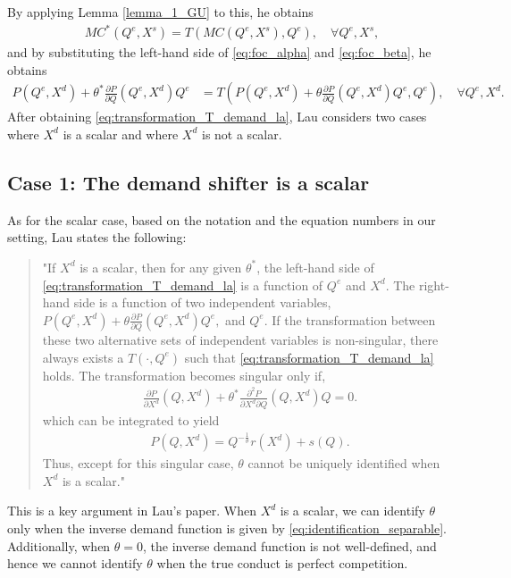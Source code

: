 \documentclass[11pt, a4paper]{article}
\theoremstyle{remark}
\begin{document}
By applying Lemma \ref{lemma_1_GU} to this, he obtains
\begin{align}
    MC^{*}(Q^e, X^{s}) = T\left(MC(Q^e, X^{s}), Q^e\right), \quad \forall Q^e, X^{s}, \label{eq:transformation_T_mc_la}
\end{align}
and by substituting the left-hand side of \eqref{eq:foc_alpha} and \eqref{eq:foc_beta}, he obtains 
\begin{align}
    P(Q^e, X^{d}) + \theta^{*} \frac{\partial P}{\partial Q}(Q^e, X^{d}) Q^e & = T\left(P(Q^e, X^{d}) + \theta \frac{\partial P}{\partial Q}(Q^e, X^{d}) Q^e, Q^e\right), \quad \forall Q^e, X^{d}.\label{eq:transformation_T_demand_la}
\end{align}
After obtaining \eqref{eq:transformation_T_demand_la}, Lau considers two cases where $X^{d}$ is a scalar and where $X^{d}$ is not a scalar.

\subsection{Case 1: The demand shifter is a scalar}

As for the scalar case, based on the notation and the equation numbers in our setting, Lau states the following:
\begin{quote}
    "If $X^{d}$ is a scalar, then for any given $\theta^*$, the left-hand side of \eqref{eq:transformation_T_demand_la} is a function of $Q^e$ and $X^{d}$.  
    The right-hand side is a function of two independent variables, $P(Q^e, X^{d}) + \theta \frac{\partial P}{\partial Q}(Q^e, X^{d}) Q^e,$ and $Q^e$.  
    If the transformation between these two alternative sets of independent variables is non-singular, there always exists a $T(\cdot, Q^e)$ such that \eqref{eq:transformation_T_demand_la} holds.
    The transformation becomes singular only if,
    \begin{align}
        \frac{\partial P}{\partial X^{d}}(Q, X^{d}) + \theta^{*} \frac{\partial^2 P}{\partial X^{d}\partial Q}(Q, X^{d})Q = 0. \label{eq:singular_equation}
    \end{align}
    which can be integrated to yield
    \begin{align}
        P(Q, X^{d}) = Q^{-\frac{1}{\theta}}r(X^{d}) + s(Q).
    \end{align}
    Thus, except for this singular case, $\theta$ cannot be uniquely identified when $X^{d}$ is a scalar."
\end{quote}
This is a key argument in Lau's paper.
When $X^{d}$ is a scalar, we can identify $\theta$ only when the inverse demand function is given by \eqref{eq:identification_separable}.
Additionally, when $\theta = 0$, the inverse demand function is not well-defined, and hence we cannot identify $\theta$ when the true conduct is perfect competition.
\end{document}
